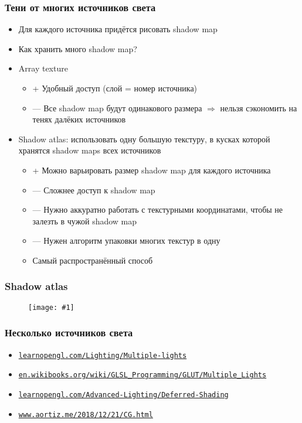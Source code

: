 \documentclass{beamer}
\newcommand{\slideimage}[1]{
  \begin{figure}
    \begin{adjustbox}{width=\textwidth, totalheight=\textheight-2\baselineskip-2\baselineskip,keepaspectratio}
      \texttt{[image: \#1]}
    \end{adjustbox}
  \end{figure}
}
\begin{document}
\begin{frame}[fragile]
\frametitle{Тени от многих источников света}
\begin{itemize}
\item Для каждого источника придётся рисовать shadow map
\pause
\item Как хранить много shadow map?
\pause
\item Array texture
\begin{itemize}
\item {\color{green}+} Удобный доступ (слой = номер источника)
\item {\color{red}—} Все shadow map будут одинакового размера \begin{math}\Rightarrow\end{math} нельзя сэкономить на тенях далёких источников
\end{itemize}
\pause
\item Shadow atlas: использовать одну большую текстуру, в кусках которой хранятся shadow maps всех источников
\begin{itemize}
\item {\color{green}+} Можно варьировать размер shadow map для каждого источника
\item {\color{red}—} Сложнее доступ к shadow map
\item {\color{red}—} Нужно аккуратно работать с текстурными координатами, чтобы не залезть в чужой shadow map
\item {\color{red}—} Нужен алгоритм упаковки многих текстур в одну
\item Самый распространённый способ
\end{itemize}
\end{itemize}
\end{frame}

\begin{frame}[fragile]
\frametitle{Shadow atlas}
\slideimage{shadow_atlas.png}
\end{frame}

\begin{frame}[fragile]
\frametitle{Несколько источников света}
\begin{itemize}
\item \href{https://learnopengl.com/Lighting/Multiple-lights}{\nolinkurl{learnopengl.com/Lighting/Multiple-lights}}
\item \href{https://en.wikibooks.org/wiki/GLSL_Programming/GLUT/Multiple_Lights}{\nolinkurl{en.wikibooks.org/wiki/GLSL\_Programming/GLUT/Multiple\_Lights}}
\item \href{https://learnopengl.com/Advanced-Lighting/Deferred-Shading}{\nolinkurl{learnopengl.com/Advanced-Lighting/Deferred-Shading}}
\item \href{http://www.aortiz.me/2018/12/21/CG.html}{\nolinkurl{www.aortiz.me/2018/12/21/CG.html}}
\end{itemize}
\end{frame}
\end{document}
